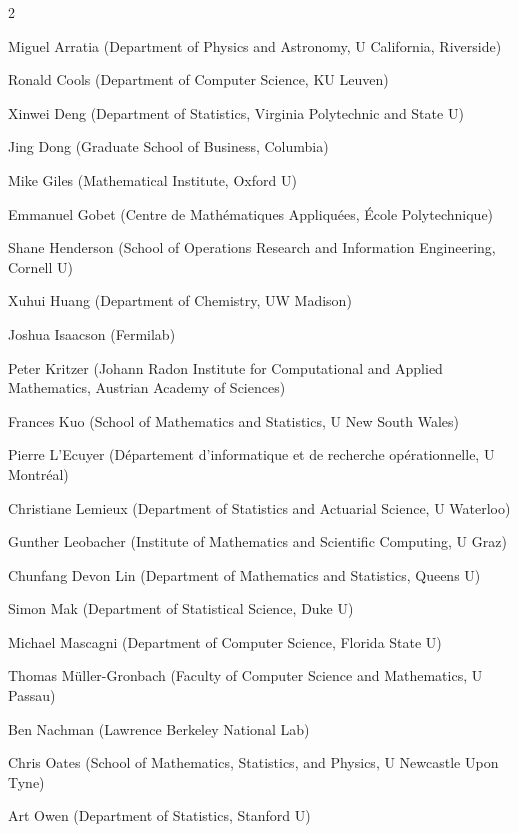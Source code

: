 \documentclass[12pt,lettersize,oneside]{book} %
\begin{document}
\setlength{\columnsep}{1cm}
\begin{multicols}{2}
\raggedright


Miguel Arratia (Department of Physics and Astronomy, U California, Riverside)

Ronald Cools (Department of Computer Science, KU Leuven)

Xinwei Deng (Department of Statistics, Virginia Polytechnic and State U)

Jing Dong (Graduate School of Business, Columbia)

Mike Giles (Mathematical Institute, Oxford U)

Emmanuel Gobet (Centre de Mathématiques Appliquées, École Polytechnique)

Shane Henderson (School of Operations Research and Information Engineering, Cornell U)

Xuhui Huang (Department of Chemistry, UW Madison)

Joshua Isaacson (Fermilab)

Peter Kritzer (Johann Radon Institute for Computational and Applied Mathematics, Austrian Academy of Sciences)

Frances Kuo (School of Mathematics and Statistics, U New South Wales)

Pierre L'Ecuyer (Département d'informatique et de recherche opérationnelle, U Montréal)

Christiane Lemieux (Department of Statistics and Actuarial Science, U Waterloo)

Gunther Leobacher (Institute of Mathematics and Scientific Computing, U Graz)

Chunfang Devon Lin (Department of Mathematics and Statistics, Queens U)

Simon Mak (Department of Statistical Science, Duke U)

Michael Mascagni (Department of Computer Science, Florida State U)

Thomas Müller-Gronbach (Faculty of Computer Science and Mathematics, U Passau)

Ben Nachman (Lawrence Berkeley National Lab)

Chris Oates (School of Mathematics, Statistics, and Physics, U Newcastle Upon Tyne)

Art Owen (Department of Statistics, Stanford U)


\end{multicols}
\end{document}
